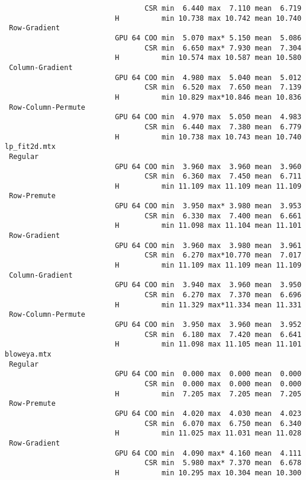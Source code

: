 {\begin{verbatim}
                                 CSR min  6.440 max  7.110 mean  6.719
                          H          min 10.738 max 10.742 mean 10.740
 Row-Gradient
                          GPU 64 COO min  5.070 max* 5.150 mean  5.086
                                 CSR min  6.650 max* 7.930 mean  7.304
                          H          min 10.574 max 10.587 mean 10.580
 Column-Gradient
                          GPU 64 COO min  4.980 max  5.040 mean  5.012
                                 CSR min  6.520 max  7.650 mean  7.139
                          H          min 10.829 max*10.846 mean 10.836
 Row-Column-Permute
                          GPU 64 COO min  4.970 max  5.050 mean  4.983
                                 CSR min  6.440 max  7.380 mean  6.779
                          H          min 10.738 max 10.743 mean 10.740
lp_fit2d.mtx
 Regular
                          GPU 64 COO min  3.960 max  3.960 mean  3.960
                                 CSR min  6.360 max  7.450 mean  6.711
                          H          min 11.109 max 11.109 mean 11.109
 Row-Premute
                          GPU 64 COO min  3.950 max* 3.980 mean  3.953
                                 CSR min  6.330 max  7.400 mean  6.661
                          H          min 11.098 max 11.104 mean 11.101
 Row-Gradient
                          GPU 64 COO min  3.960 max  3.980 mean  3.961
                                 CSR min  6.270 max*10.770 mean  7.017
                          H          min 11.109 max 11.109 mean 11.109
 Column-Gradient
                          GPU 64 COO min  3.940 max  3.960 mean  3.950
                                 CSR min  6.270 max  7.370 mean  6.696
                          H          min 11.329 max*11.334 mean 11.331
 Row-Column-Permute
                          GPU 64 COO min  3.950 max  3.960 mean  3.952
                                 CSR min  6.180 max  7.420 mean  6.641
                          H          min 11.098 max 11.105 mean 11.101
bloweya.mtx
 Regular
                          GPU 64 COO min  0.000 max  0.000 mean  0.000
                                 CSR min  0.000 max  0.000 mean  0.000
                          H          min  7.205 max  7.205 mean  7.205
 Row-Premute
                          GPU 64 COO min  4.020 max  4.030 mean  4.023
                                 CSR min  6.070 max  6.750 mean  6.340
                          H          min 11.025 max 11.031 mean 11.028
 Row-Gradient
                          GPU 64 COO min  4.090 max* 4.160 mean  4.111
                                 CSR min  5.980 max* 7.370 mean  6.678
                          H          min 10.295 max 10.304 mean 10.300

\end{verbatim}}
